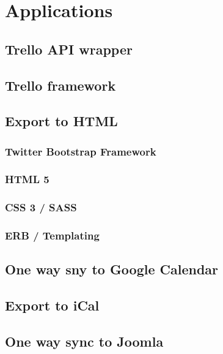 
\chapter{Applications}
  \label{Applications}

\section{Trello API wrapper}

\section{Trello framework}

\section{Export to HTML}

\subsection{Twitter Bootstrap Framework}

\subsection{HTML 5}

\subsection{CSS 3 / SASS}

\subsection{ERB / Templating}

\section{One way sny to Google Calendar}

\section{Export to iCal}

\section{One way sync to Joomla}

